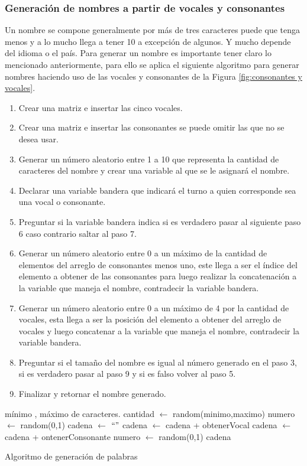 \subsubsection{Generaci\'on de nombres a partir de vocales y consonantes}
Un nombre se compone generalmente por m\'as de tres caracteres puede que tenga menos y a lo mucho llega a tener 10 a excepci\'on de algunos. Y mucho depende del idioma o el pa\'is.
Para generar un nombre es importante tener claro lo mencionado anteriormente, para ello se aplica el siguiente algoritmo para generar nombres haciendo uso de las vocales y consonantes de la Figura \ref{fig:consonantes y vocales}.
\begin{enumerate}
\item Crear una matriz e insertar las cinco vocales.
\item Crear una matriz e insertar las consonantes se puede omitir las que no se desea usar.
\item Generar un n\'umero aleatorio entre 1 a 10 que representa la cantidad de caracteres del nombre y crear una variable al que se le asignar\'a el nombre.
\item Declarar una variable bandera que indicar\'a el turno a quien corresponde sea una vocal o consonante.
\item Preguntar si la variable bandera indica si es verdadero pasar al siguiente paso 6 caso contrario saltar al paso 7.
\item Generar un n\'umero aleatorio entre 0 a un m\'aximo de la cantidad de elementos del arreglo de consonantes menos uno, este llega a ser el \'indice del elemento a obtener de las consonantes para luego realizar la concatenaci\'on a la variable que maneja el nombre, contradecir la variable bandera.
\item Generar un n\'umero aleatorio entre 0 a un m\'aximo de 4 por la cantidad de vocales, esta llega a ser la posici\'on del elemento a obtener del arreglo de vocales y luego concatenar a la variable que maneja el nombre, contradecir la variable bandera.
\item Preguntar si el tama\~no del nombre es igual al n\'umero generado en el paso 3, si es verdadero pasar al paso 9 y si es falso volver al paso 5.
\item Finalizar y retornar el nombre generado. 
\end{enumerate}
\begin{algorithm}[H]
\begin{algorithmic}[1]
\REQUIRE m\'inimo , m\'aximo de caracteres.
\STATE cantidad $\leftarrow$ random(minimo,maximo)
\STATE numero $\leftarrow$ random(0,1)
\STATE cadena $\leftarrow$ $`` "$
\STATE cadena $\leftarrow$ cadena + obtenerVocal
\ELSE
\STATE cadena $\leftarrow$ cadena + ontenerConsonante
\ENDIF
\STATE numero $\leftarrow$ random(0,1)
\ENDWHILE
\RETURN cadena
\end{algorithmic}
\caption{Algoritmo de generaci\'on de palabras}\label{alg:algoritmoGeneracionPalabras}
\end{algorithm}
